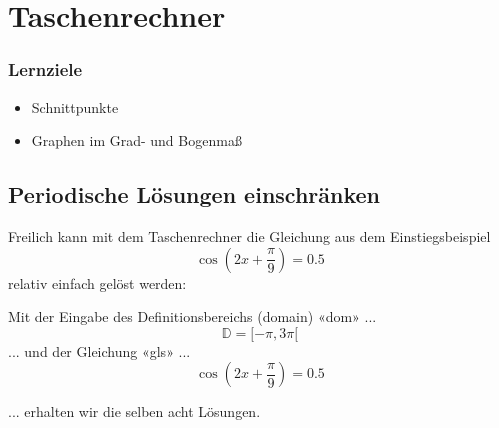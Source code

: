 
\section{Taschenrechner}

\subsubsection*{Lernziele}

\begin{itemize}
\item Schnittpunkte
\item Graphen im Grad- und Bogenmaß
\end{itemize}

\subsection{Periodische Lösungen einschränken}
Freilich kann mit dem Taschenrechner die Gleichung aus dem
Einstiegsbeispiel $$\cos(2x+\frac{\pi}{9})=0.5$$ relativ einfach gelöst werden:

Mit der Eingabe des Definitionsbereichs (domain) «dom» ...
$$\mathbb{D} =  [ -\pi, 3\pi[$$
... und der Gleichung «gls» ...
$$\cos\left(2x+\frac{\pi}{9}\right) = 0.5$$

... erhalten wir die selben acht Lösungen.
    

\newpage
